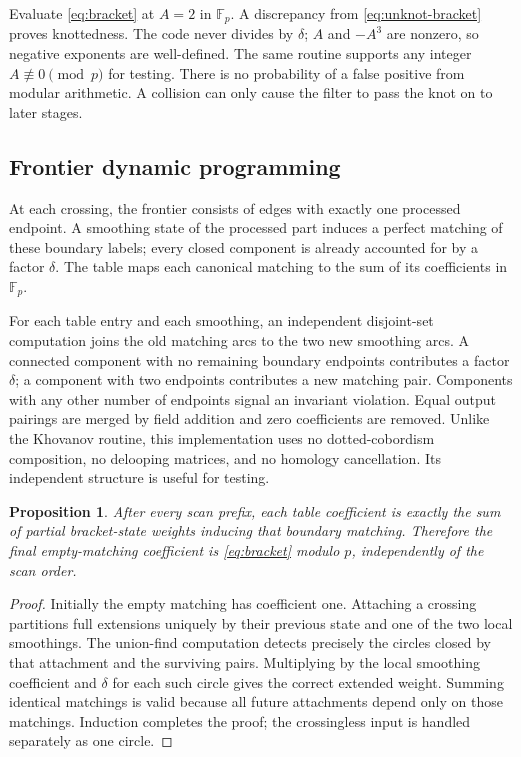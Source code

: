 \documentclass[11pt]{article}
\newtheorem{proposition}[theorem]{Proposition}
\theoremstyle{remark}\newtheorem{remark}[theorem]{Remark}
\newcommand{\F}{\mathbb F}
\begin{document}
Evaluate \eqref{eq:bracket} at $A=2$ in $\F_p$. A discrepancy from
\eqref{eq:unknot-bracket} proves knottedness. The code never divides by
$\delta$; $A$ and $-A^3$ are nonzero, so negative exponents are well-defined.
The same routine supports any integer $A\not\equiv0\pmod p$ for testing.
There is no probability of a false positive from modular arithmetic. A
collision can only cause the filter to pass the knot on to later stages.

\subsection{Frontier dynamic programming}

At each crossing, the frontier consists of edges with exactly one processed
endpoint. A smoothing state of the processed part induces a perfect matching
of these boundary labels; every closed component is already accounted for
by a factor $\delta$. The table maps each canonical matching to the sum of
its coefficients in $\F_p$.

For each table entry and each smoothing, an independent disjoint-set
computation joins the old matching arcs to the two new smoothing arcs.
A connected component with no remaining boundary endpoints contributes a
factor $\delta$; a component with two endpoints contributes a new matching
pair. Components with any other number of endpoints signal an invariant
violation. Equal output pairings are merged by field addition and zero
coefficients are removed. Unlike the Khovanov routine, this implementation
uses no dotted-cobordism composition, no delooping matrices, and no homology
cancellation. Its independent structure is useful for testing.

\begin{proposition}
After every scan prefix, each table coefficient is exactly the sum of
partial bracket-state weights inducing that boundary matching. Therefore
the final empty-matching coefficient is \eqref{eq:bracket} modulo $p$,
independently of the scan order.
\end{proposition}
\begin{proof}
Initially the empty matching has coefficient one. Attaching a crossing
partitions full extensions uniquely by their previous state and one of
the two local smoothings. The union-find computation detects precisely
the circles closed by that attachment and the surviving pairs. Multiplying
by the local smoothing coefficient and $\delta$ for each such circle gives
the correct extended weight. Summing identical matchings is valid because
all future attachments depend only on those matchings. Induction completes
the proof; the crossingless input is handled separately as one circle.
\end{proof}
\end{document}
